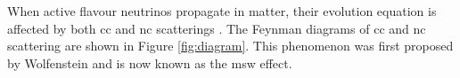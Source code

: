 %

When active flavour neutrinos propagate in matter, their evolution equation is affected by both \acrshort{cc} and \acrshort{nc} scatterings \cite{giunti}.  The Feynman diagrams of \acrshort{cc} and \acrshort{nc} scattering are shown in Figure \ref{fig:diagram}. This phenomenon was first proposed by Wolfenstein \cite{wolfenstein} and is now known as the \acrfull{msw} effect.

